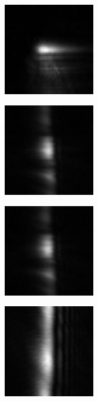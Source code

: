 \begin{figure}[ht]
  \centering
  \begin{subfigure}[b]{4cm}
    \includegraphics[width=4cm,keepaspectratio]{interference/figures/move/321-1.jpg}
    \caption{}
  \end{subfigure}
  \begin{subfigure}[b]{4cm}
    \includegraphics[width=4cm,keepaspectratio]{interference/figures/move/321-2.jpg}
    \caption{}
  \end{subfigure}
  \begin{subfigure}[b]{4cm}
    \includegraphics[width=4cm,keepaspectratio]{interference/figures/move/321-3.jpg}
    \caption{}
  \end{subfigure}
  \begin{subfigure}[b]{4cm}
    \includegraphics[width=4cm,keepaspectratio]{interference/figures/move/321-7.jpg}
    \caption{}

\end{subfigure}
\end{figure}
